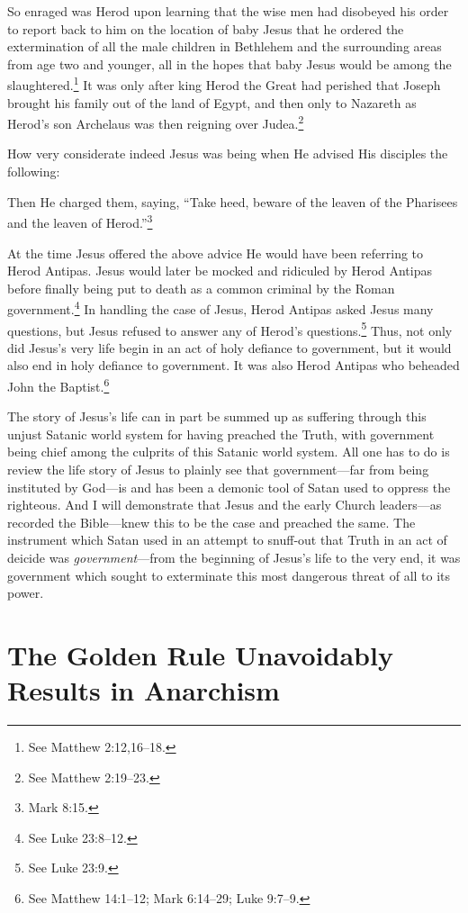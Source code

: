 \documentclass[letterpaper,12pt]{article}
\newenvironment{squote}
  {\small\quote}
  {\endquote\normalsize}
\begin{document}
So enraged was Herod upon learning that the wise men had disobeyed his order to report back to him on the location of baby Jesus that he ordered the extermination of all the male children in Bethlehem and the surrounding areas from age two and younger, all in the hopes that baby Jesus would be among the slaughtered.\footnote{See Matthew 2:12,16--18.} It was only after king Herod the Great had perished that Joseph brought his family out of the land of Egypt, and then only to Nazareth as Herod's son Archelaus was then reigning over Judea.\footnote{See Matthew 2:19--23.}

How very considerate indeed Jesus was being when He advised His disciples the following:

\begin{squote}
Then He charged them, saying, ``Take heed, beware of the leaven of the Pharisees and the leaven of Herod.''\footnote{Mark 8:15.}
\end{squote}

At the time Jesus offered the above advice He would have been referring to Herod Antipas. Jesus would later be mocked and ridiculed by Herod Antipas before finally being put to death as a common criminal by the Roman government.\footnote{See Luke 23:8--12.} In handling the case of Jesus, Herod Antipas asked Jesus many questions, but Jesus refused to answer any of Herod's questions.\footnote{See Luke 23:9.} Thus, not only did Jesus's very life begin in an act of holy defiance to government, but it would also end in holy defiance to government. It was also Herod Antipas who beheaded John the Baptist.\footnote{See Matthew 14:1--12; Mark 6:14--29; Luke 9:7--9.}

The story of Jesus's life can in part be summed up as suffering through this unjust Satanic world system for having preached the Truth, with government being chief among the culprits of this Satanic world system. All one has to do is review the life story of Jesus to plainly see that government---far from being instituted by God---is and has been a demonic tool of Satan used to oppress the righteous. And I will demonstrate that Jesus and the early Church leaders---as recorded the Bible---knew this to be the case and preached the same. The instrument which Satan used in an attempt to snuff-out that Truth in an act of deicide was \emph{government}---from the beginning of Jesus's life to the very end, it was government which sought to exterminate this most dangerous threat of all to its power.

\section{The Golden Rule Unavoidably Results in Anarchism}
\label{sec:TheGoldenRuleUnavoidablyResultsInAnarchism}
\end{document}
